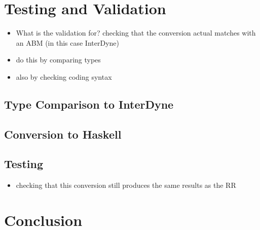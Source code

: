 \documentclass{article}
\begin{document}
\section{Testing and Validation}





\begin{itemize}
  \item What is the validation for? checking that the conversion actual matches with an ABM (in this case InterDyne)
  \item do this by comparing types 
  \item also by checking coding syntax 
\end{itemize}


\subsection{Type Comparison to InterDyne}


\subsection{Conversion to Haskell}

\subsection{Testing}

\begin{itemize}
  \item checking that this conversion still produces the same results as the RR 
\end{itemize}



\section{Conclusion}
\end{document}
